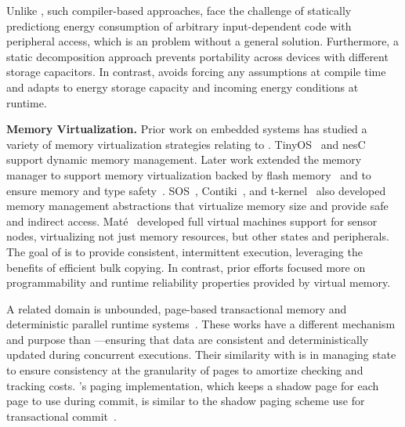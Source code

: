 Unlike \sys, such compiler-based approaches, face the challenge of statically
predictiong energy consumption of arbitrary input-dependent code with
peripheral access, which is an problem without a general solution. Furthermore,
a static decomposition approach prevents portability across devices with
different storage capacitors. In contrast, \sys avoids forcing any assumptions
at compile time and adapts to energy storage capacity and incoming energy
conditions at runtime.


\textbf{Memory Virtualization.} Prior work on embedded systems has studied a
variety of memory virtualization strategies relating to \sys.
TinyOS~\cite{levis2005tinyos} and nesC~\cite{nesc} support dynamic memory
management. Later work extended the memory manager to support memory
virtualization backed by flash memory~\cite{sensornetvm} and to ensure memory
and type safety~\cite{tinyosmemorysafety}. SOS~\cite{sos},
Contiki~\cite{contiki}, and t-kernel~\cite{tkernel} also developed memory
management abstractions that virtualize memory size and provide safe and
indirect access. Mat\'e~\cite{mate} developed full virtual machines support for
sensor nodes, virtualizing not just memory resources, but other states and
peripherals. The goal of \sys is to provide consistent, intermittent execution,
leveraging the benefits of efficient bulk copying. In contrast, prior efforts
focused more on programmability and runtime reliability properties provided by
virtual memory.

A related domain is unbounded, page-based transactional memory and
deterministic parallel runtime systems~\cite{pagebasedtm,grace}.  These works
have a different mechanism and purpose than \sys---ensuring that data are
consistent and deterministically updated during concurrent executions.  Their
similarity with \sys is in managing state to ensure consistency at
the granularity of pages to amortize checking and tracking costs.
\sys's paging implementation, which keeps a shadow page for each page to use
during commit, is similar to the shadow paging scheme use for transactional
commit~\cite{pagebasedtm}.
